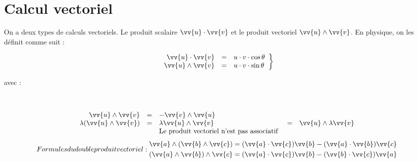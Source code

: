 \documentclass[11pt,a4paper,fleqn,pdftex]{report}
\begin{document}
\section{Calcul vectoriel}
On a deux types de calculs vectoriels. Le produit scalaire $\vv{u} \cdot\vv{v}$ et le produit vectoriel $\vv{u}\wedge\vv{v}$. En physique, on les définit comme suit : \\%
\begin{minipage}{6cm}
\begin{equation}
\left.
\begin{array}{r c l}
\vv{u}\cdot\vv{v}&=&u\cdot{}v\cdot\cos{\theta}\\
\vv{u}\wedge\vv{v}&=&u\cdot{}v\cdot\sin{\theta}\\
\end{array}
\right\rbrace
\end{equation}
\end{minipage}
\begin{minipage}{2cm}
avec :
\end{minipage}
\begin{minipage}{5cm}
	\vspace{10pt}
\end{minipage}\hfill \\
\begin{prop}
$$
\begin{array}{r c l c l}
\vv{u}\wedge\vv{v}&=&-\vv{v}\wedge\vv{u}\\
\lambda (\vv{u}\wedge\vv{v})&=&\lambda\vv{u}\wedge\vv{v}&=&\vv{u}\wedge\lambda\vv{v}\\
&&\text{Le produit vectoriel n'est pas associatif }
\end{array}
$$
\begin{subequations}
Formules du double produit vectoriel : 
   \begin{align}
      \vv{a}\wedge(\vv{b}\wedge \vv{c})&=(\vv{a}\cdot \vv{c})\vv{b}-(\vv{a}\cdot \vv{b})\vv{c}\label{eq:double_produit_vectoriel}\\
(\vv{a}\wedge \vv{b})\wedge \vv{c}&=(\vv{a}\cdot \vv{c})\vv{b}-(\vv{b}\cdot \vv{c})\vv{a}
   \end{align}
\end{subequations}


\end{prop}
\end{document}
